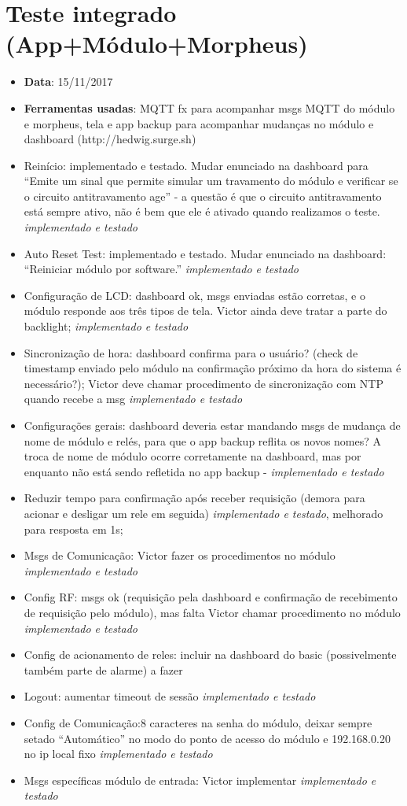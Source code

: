 \chapter{Teste integrado (App+Módulo+Morpheus)}
\label{atttestefimafim}

\begin{itemize}
	\item \textbf{Data}: 15/11/2017
	\item \textbf{Ferramentas usadas}: MQTT fx para acompanhar msgs MQTT do módulo e morpheus, tela e app backup para acompanhar mudanças no módulo e dashboard (http://hedwig.surge.sh)
\item Reinício: implementado e testado. Mudar enunciado na dashboard para “Emite um sinal que permite simular um travamento do módulo e verificar se o circuito antitravamento age” - a questão é que o circuito antitravamento está sempre ativo, não é bem que ele é ativado quando realizamos o teste.  \textit{implementado e testado}
\item Auto Reset Test: implementado e testado. Mudar enunciado na dashboard: “Reiniciar módulo por software.”  \textit{implementado e testado}
\item Configuração de LCD: dashboard ok, msgs enviadas estão corretas, e o módulo responde aos três tipos de tela. Victor ainda deve tratar a parte do backlight;  \textit{implementado e testado}
\item Sincronização de hora: dashboard confirma para o usuário? (check de timestamp enviado pelo módulo na confirmação próximo da hora do sistema é necessário?); Victor deve chamar procedimento de sincronização com NTP quando recebe a msg   \textit{implementado e testado}
\item Configurações gerais: dashboard deveria estar mandando msgs de mudança de nome de módulo e relés, para que o app backup reflita os novos nomes? A troca de nome de módulo ocorre corretamente na dashboard, mas por enquanto não está sendo refletida no app backup -  \textit{implementado e testado}
\item Reduzir tempo para confirmação após receber requisição (demora para acionar e desligar um rele em seguida)  \textit{implementado e testado}, melhorado para resposta em 1s;
\item Msgs de Comunicação: Victor fazer os procedimentos no módulo \textit{implementado e testado}
\item Config RF: msgs ok (requisição pela dashboard e confirmação de recebimento de requisição pelo módulo), mas falta Victor chamar procedimento no módulo \textit{implementado e testado}
\item Config de acionamento de reles: incluir na dashboard do basic (possivelmente também parte de alarme) a fazer
\item Logout: aumentar timeout de sessão \textit{implementado e testado}
\item Config de Comunicação:8 caracteres na senha do módulo, deixar sempre setado “Automático” no modo do ponto de acesso do módulo e 192.168.0.20 no ip local fixo \textit{implementado e testado}
\item Msgs específicas módulo de entrada: Victor implementar \textit{implementado e testado}
\end{itemize}